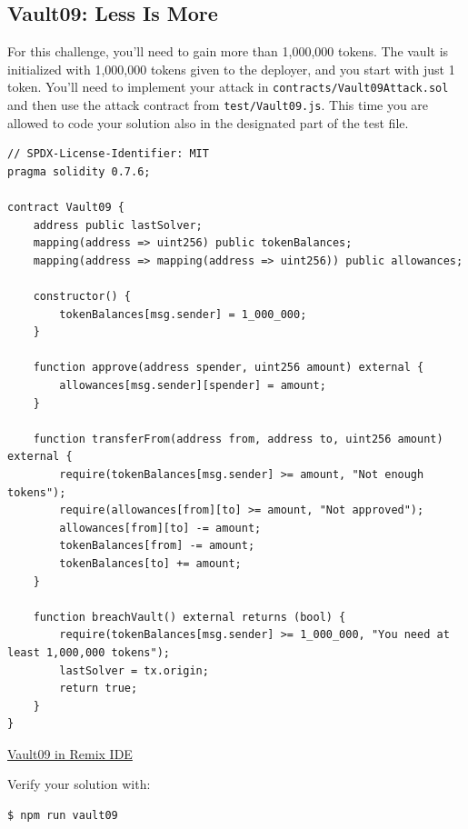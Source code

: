 \documentclass[12pt]{article}
\begin{document}
\subsection*{Vault09: Less Is More}

For this challenge, you'll need to gain more than 1,000,000 tokens. The vault is initialized with 1,000,000 tokens given to the deployer, and you start with just 1 token. You'll need to implement your attack in \texttt{contracts/Vault09Attack.sol} and then use the attack contract from \texttt{test/Vault09.js}. This time you are allowed to code your solution also in the designated part of the test file.

\begin{lstlisting}[language=Solidity]
// SPDX-License-Identifier: MIT
pragma solidity 0.7.6;

contract Vault09 {
    address public lastSolver;
    mapping(address => uint256) public tokenBalances;
    mapping(address => mapping(address => uint256)) public allowances;
    
    constructor() {
        tokenBalances[msg.sender] = 1_000_000;
    }
    
    function approve(address spender, uint256 amount) external {
        allowances[msg.sender][spender] = amount;
    }
    
    function transferFrom(address from, address to, uint256 amount) external {
        require(tokenBalances[msg.sender] >= amount, "Not enough tokens");
        require(allowances[from][to] >= amount, "Not approved");
        allowances[from][to] -= amount;
        tokenBalances[from] -= amount;
        tokenBalances[to] += amount;
    }
    
    function breachVault() external returns (bool) {
        require(tokenBalances[msg.sender] >= 1_000_000, "You need at least 1,000,000 tokens");
        lastSolver = tx.origin;
        return true;
    }
}
\end{lstlisting}

\medskip
\noindent
\href{https://remix.ethereum.org/?#activate=solidity&url=https://github.com/radovluk/unbreakable-vault/contracts/Vault09.sol&lang=en&optimize=false&runs=200&evmVersion=null&version=soljson-v0.7.6+commit.7338295f.js}{Vault09 in Remix IDE}

\medskip
\noindent
Verify your solution with:
\begin{verbatim}
$ npm run vault09
\end{verbatim}
\end{document}
